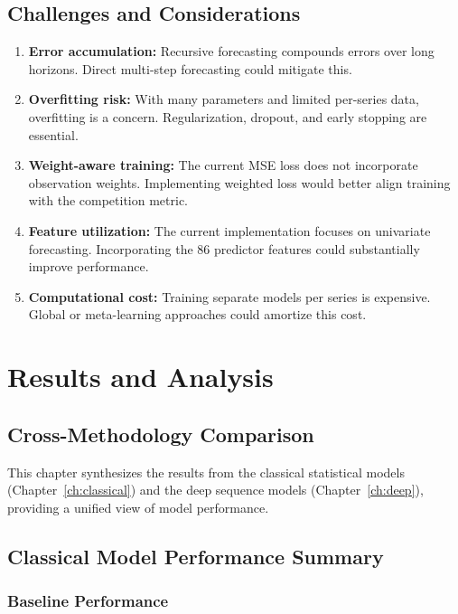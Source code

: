 \section{Challenges and Considerations}

\begin{enumerate}
    \item \textbf{Error accumulation:} Recursive forecasting compounds errors over long horizons. Direct multi-step forecasting could mitigate this.
    \item \textbf{Overfitting risk:} With many parameters and limited per-series data, overfitting is a concern. Regularization, dropout, and early stopping are essential.
    \item \textbf{Weight-aware training:} The current MSE loss does not incorporate observation weights. Implementing weighted loss would better align training with the competition metric.
    \item \textbf{Feature utilization:} The current implementation focuses on univariate forecasting. Incorporating the 86 predictor features could substantially improve performance.
    \item \textbf{Computational cost:} Training separate models per series is expensive. Global or meta-learning approaches could amortize this cost.
\end{enumerate}


\chapter{Results and Analysis}
\label{ch:results}

\section{Cross-Methodology Comparison}

This chapter synthesizes the results from the classical statistical models (Chapter~\ref{ch:classical}) and the deep sequence models (Chapter~\ref{ch:deep}), providing a unified view of model performance.

\section{Classical Model Performance Summary}

\subsection{Baseline Performance}

